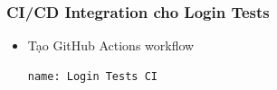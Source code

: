 \documentclass[a4paper,12pt]{article}
\begin{document}
{%












\subsubsection{CI/CD Integration cho Login Tests}


\begin{itemize}
    \item Tạo GitHub Actions workflow
\begin{tcolorbox}[breakable, colback=green!5,colframe=black!50,title=Tạo GitHub Actions Workflow ]
\begin{lstlisting}
name: Login Tests CI


\end{lstlisting}
\end{tcolorbox}
\end{itemize}}
\end{document}
